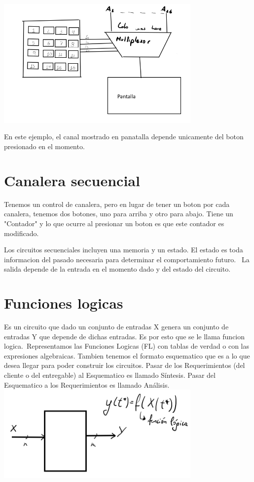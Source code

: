 \documentclass{report}
\begin{document}
\includegraphics[width=10cm]{../Assets/canalera_combinatoria_19-03-24.png}

En este ejemplo, el canal mostrado en panatalla depende unicamente del boton presionado en el momento.

\section{Canalera secuencial}

Tenemos un control de canalera, pero en lugar de tener un boton por cada canalera, tenemos dos botones, uno para arriba y otro para abajo.
Tiene un "Contador" y lo que ocurre al presionar un boton es que este contador es modificado.

Los circuitos secuenciales incluyen una memoria y un estado.
El estado es toda informacion del pasado necesaria para determinar el comportamiento futuro. \
La salida depende de la entrada en el momento dado y del estado del circuito.



\section{Funciones logicas}

Es un circuito que dado un conjunto de entradas X genera un conjunto de entradas Y que depende de dichas entradas. Es por esto que se le llama funcion logica.\
Representamos las Funciones Logicas (FL) con tablas de verdad o con las expresiones algebraicas. Tambien tenemos el formato esquematico que es a lo que desea llegar para poder construir los circuitos.
Pasar de los Requerimientos (del cliente o del entregable) al Esquematico es llamado Síntesis. Pasar del Esquematico a los Requerimientos es llamado Análisis.
\includegraphics[width=10cm]{../Assets/circuitos_combinatorios2.png}
\end{document}
